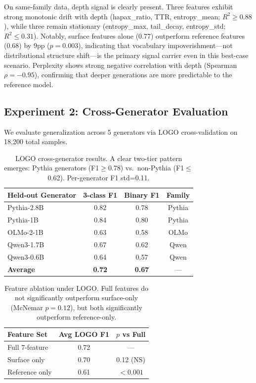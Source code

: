 \documentclass[11pt,a4paper]{article}
\begin{document}
On same-family data, depth signal is clearly present. Three features exhibit strong monotonic drift with depth (hapax\_ratio, TTR, entropy\_mean; $R^2 \geq 0.88$), while three remain stationary (entropy\_max, tail\_decay, entropy\_std; $R^2 \leq 0.31$). Notably, surface features alone (0.77) outperform reference features (0.68) by 9pp ($p=0.003$), indicating that vocabulary impoverishment---not distributional structure shift---is the primary signal carrier even in this best-case scenario. Perplexity shows strong negative correlation with depth (Spearman $\rho=-0.95$), confirming that deeper generations are more predictable to the reference model.

\subsection{Experiment 2: Cross-Generator Evaluation}
\label{sec:exp2}

We evaluate generalization across 5 generators via LOGO cross-validation on 18,200 total samples.

\begin{table}[h]
\centering
\small
\begin{tabular}{lccc}
\toprule
\textbf{Held-out Generator} & \textbf{3-class F1} & \textbf{Binary F1} & \textbf{Family} \\
\midrule
Pythia-2.8B & 0.82 & 0.78 & Pythia \\
Pythia-1B & 0.84 & 0.80 & Pythia \\
OLMo-2-1B & 0.63 & 0.58 & OLMo \\
Qwen3-1.7B & 0.67 & 0.62 & Qwen \\
Qwen3-0.6B & 0.64 & 0.57 & Qwen \\
\midrule
\textbf{Average} & \textbf{0.72} & \textbf{0.67} & --- \\
\bottomrule
\end{tabular}
\caption{LOGO cross-generator results. A clear two-tier pattern emerges: Pythia generators (F1$\geq$0.78) vs.\ non-Pythia (F1$\leq$0.62). Per-generator F1 std=0.11.}
\label{tab:logo}
\end{table}

\begin{table}[h]
\centering
\small
\begin{tabular}{lcc}
\toprule
\textbf{Feature Set} & \textbf{Avg LOGO F1} & \textbf{$p$ vs Full} \\
\midrule
Full 7-feature & 0.72 & --- \\
Surface only & 0.70 & 0.12 (NS) \\
Reference only & 0.61 & $<0.001$ \\
\bottomrule
\end{tabular}
\caption{Feature ablation under LOGO. Full features do not significantly outperform surface-only (McNemar $p=0.12$), but both significantly outperform reference-only.}
\label{tab:ablation_logo}
\end{table}
\end{document}
